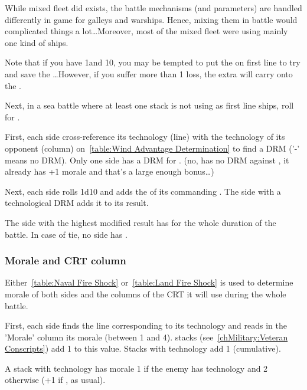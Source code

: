 \begin{designnote}
  While mixed fleet did exists, the battle mechanisms (and parameters) are
  handled differently in game for galleys and warships. Hence, mixing them in
  battle would complicated things a lot\ldots Moreover, most of the mixed
  fleet were using mainly one kind of ships.

  Note that if you have 1\NWD and 10\NGD, you may be tempted to put the \NWD
  on first line to try and save the \NGD\ldots However, if you suffer more
  than 1 loss, the extra will carry onto the \NGD.
\end{designnote}

Next, in a sea battle where at least one stack is not using \NGD as first line
ships, roll for .


First, each side cross-reference its technology (line) with the technology of
its opponent (column) on~\ref{table:Wind Advantage Determination} to find a
DRM ('-' means no DRM). Only one side has a DRM for .
(no, \TBAT has no DRM against \TGF, it already has +1 morale and that's a
large enough bonus\ldots)

Next, each side rolls 1d10 and adds the \Man of its commanding \LeaderA. The
side with a technological DRM adds it to its result.

The side with the highest modified result has  for the
whole duration of the battle. In case of tie, no side has .

\subsubsection{Morale and CRT column}
Either~\ref{table:Naval Fire Shock} or~\ref{table:Land Fire Shock} is used to
determine morale of both sides and the columns of the CRT it will use during
the whole battle.



First, each side finds the line corresponding to its technology and reads in
the 'Morale' column its morale (between 1 and 4).  stacks
(see~\ref{chMilitary:Veteran Conscripts}) add 1 to this value. Stacks with
\TTER technology add 1 (cumulative).

A stack with \TREN technology has morale 1 if the enemy has \TMED technology
and 2 otherwise (+1 if , as usual).

